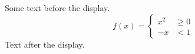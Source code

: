\documentclass[12pt]{article}
\begin{document}
Some text before the display.
\[ f(x) = \left\{ \begin{aligned} x^2 &\geq 0 \\ -x &< 1 \end{aligned} \right. \]
Text after the display.
\end{document}
